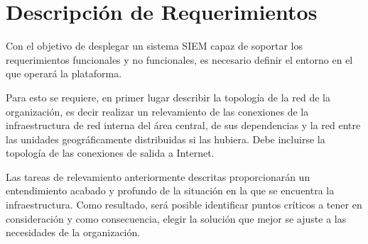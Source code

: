 \chapter{\Large Descripción de Requerimientos}
    Con el objetivo de desplegar un sistema SIEM capaz de soportar los requerimientos funcionales y no funcionales, es necesario definir el entorno en el que operará la plataforma. \par
    Para esto se requiere, en primer lugar describir la topología de la red de la organización, es decir realizar un relevamiento de las conexiones  de la infraestructura de red interna del área central, de sus dependencias y la red entre las unidades geográficamente distribuidas si las hubiera. Debe incluirse la topología de las conexiones de salida a Internet. \par
    Las tareas de relevamiento anteriormente descritas proporcionarán un entendimiento acabado y profundo de la situación en la que se encuentra la infraestructura. Como resultado, será posible identificar puntos críticos a tener en consideración y como consecuencia, elegir la solución que mejor se ajuste a las necesidades de la organización. \par

